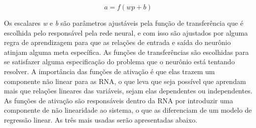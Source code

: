 \documentclass[
	12pt,				%
    oneside,			%
	a4paper,			%
	english,			%
	french,				%
	spanish,			%
	brazil,				%
	]{abntex2}
\begin{document}
  \begin{equation}
    a = {f(wp+b)}
    \label{eq:neuonio_simples}
  \end{equation}


 Os escalares \textit{w} e \textit{b} são parâmetros ajustáveis pela função de transferência que é escolhida pelo responsável pela rede neural, e com isso são ajustados por alguma regra de aprendizagem para que as relações de entrada e saída do neurônio atinjam alguma meta específica.
As funções de transferências são escolhidas para se satisfazer alguma especificação do problema que o neurônio está tentando resolver. A importância das funções de ativação é que elas trazem um componente não linear para as RNA, o que leva que seja possível que aprendam mais que relações lineares das variáveis, sejam elas dependentes ou independentes. As funções de ativação são responsáveis dentro da RNA por introduzir uma componente de não linearidade ao sistema, o que as diferenciam de um modelo de regressão linear. As três mais usadas serão apresentadas abaixo.
\end{document}
